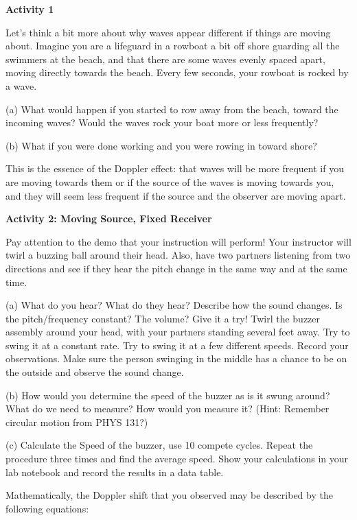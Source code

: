 \textbf{Activity 1}

Let’s think a bit more about why waves appear different if things are moving about. Imagine you are a lifeguard in a rowboat a bit off shore guarding all the swimmers at the beach, and that there are some waves evenly spaced apart, moving directly towards the beach. Every few seconds, your rowboat is rocked by a wave. 

(a) What would happen if you started to row away from the beach, toward the incoming waves? Would the waves rock your boat more or less frequently? 
\answerspace{32mm}


(b) What if you were done working and you were rowing in toward shore? 
\answerspace{32mm}

This is the essence of the Doppler effect: that waves will be more frequent if you are moving towards them or if the source of the waves is moving towards you, and they will seem less frequent if the source and the observer are moving apart.
\vspace{0.3cm}

\textbf{Activity 2: Moving Source, Fixed Receiver}

Pay attention to the demo that your instruction will perform! Your instructor will twirl a buzzing ball around their head. Also, have two partners listening from two directions and see if they hear the pitch change in the same way and at the same time.

(a) What do you hear? What do they hear? Describe how the sound changes. Is the pitch/frequency constant? The volume? Give it a try! Twirl the buzzer assembly around your head, with your partners standing several feet away. Try to swing it at a constant rate. Try to swing it at a few different speeds. Record your observations. Make sure the person swinging in the middle has a chance to be on the outside and observe the sound change.
\answerspace{30mm}

(b) How would you determine the speed of the buzzer as is it swung around? What do we need to measure? How would you measure it? (Hint: Remember circular motion from PHYS 131?)
\answerspace{30mm}

(c) Calculate the Speed of the buzzer, use 10 compete cycles. Repeat the procedure three times and find the average speed. Show your calculations in your lab notebook and record the results in a data table.
\answerspace{30mm}

Mathematically, the Doppler shift that you observed may be described by the following equations:

